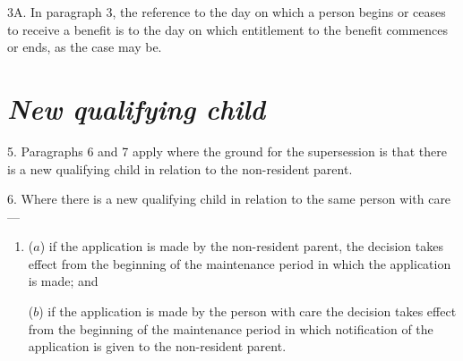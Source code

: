 \documentclass[12pt,a4paper]{article}
\begin{document}
\medskip

3A.  In paragraph 3, the reference to the day on which a person begins or ceases to receive a benefit is to the day on which entitlement to the benefit commences or ends, as the case may be.


%

\section*{\itshape New qualifying child}

5.  Paragraphs 6 and 7 apply where the ground for the supersession is that there is a new qualifying child in relation to the non-resident parent.

\medskip

6.  Where there is a new qualifying child in relation to the same person with care—
\begin{enumerate}\item[]
($a$) if the application is made by the non-resident parent, the decision takes effect from the beginning of the maintenance period in which the application is made; and

($b$) if the application is made by the person with care the decision takes effect from the beginning of the maintenance period in which notification of the application is given to the non-resident parent.
\end{enumerate}
\end{document}
